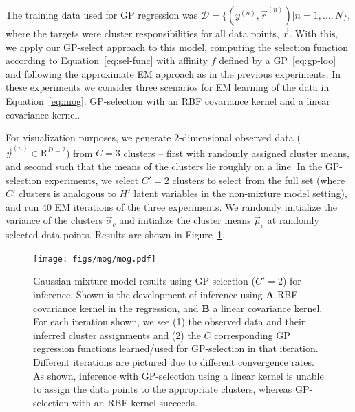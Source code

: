 The training data used for GP regression was $\mathcal{D} = \{ (y^{(n)}, \vec{r}^{(n)}) | n = 1, \dots, N \}$, where the targets were cluster responsibilities for all data points, $\vec{r}$.
With this, we apply our GP-select approach to this model, computing the selection function according to Equation~\eqref{eq:sel-func} with affinity $f$ defined by a GP~\eqref{eq:gp-loo} 
and following the approximate EM approach as in the previous experiments.
%
In these experiments we consider three scenarios for EM learning of the data in Equation~\eqref{eq:mog}: GP-selection with an RBF covariance kernel and a linear covariance kernel.%
%

For visualization purposes, we generate $2$-dimensional observed data ($\vec{y}^{(n)} \in \mathrm{R}^{D=2} $) from $C=3$ clusters -- first with randomly assigned cluster means, and second such that the means of the clusters lie roughly on a line.
In the GP-selection experiments, we select $C' = 2$ clusters to select from the full set (where $C'$ clusters is analogous to $H'$ latent variables in the non-mixture model setting),
and run $40$ EM iterations of the three experiments.
We randomly initialize the variance of the clusters $\vec{\sigma}_c$ and initialize the cluster means $\vec{\mu}_c$ at randomly selected data points.
Results are shown in Figure~\ref{fig:mog}.

\begin{figure}[t]
\begin{center}
\texttt{[image: figs/mog/mog.pdf]}
\caption{Gaussian mixture model results using GP-selection ($C'=2$) for inference.
Shown is the development of inference using \textbf{A} RBF covariance kernel in the regression, and \textbf{B} a linear covariance kernel.
For each iteration shown, we see (1) the observed data and their inferred cluster assignments and (2) the $C$ corresponding GP regression functions learned/used for GP-selection in that iteration. Different iterations are pictured due to different convergence rates. As shown, inference with GP-selection using a linear kernel is unable to assign the data points to the appropriate clusters, whereas GP-selection with an RBF kernel succeeds.}\label{fig:mog}%
\end{center}
\end{figure}

